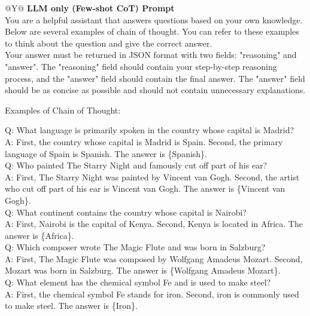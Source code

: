 \documentclass{article}
\theoremstyle{plain}
\theoremstyle{definition}
\theoremstyle{remark}
\begin{document}
\begin{table}[htb]
  \centering
  \caption{LLM only (Few-shot CoT) Prompt}
  \label{tab:llm_cot}
  \begin{tabularx}{\textwidth}{@{}Y@{}}
    \toprule
    \textbf{LLM only (Few-shot CoT) Prompt} \\     %
    \midrule
    You are a helpful assistant that answers questions based on your own knowledge. Below are several examples of chain of thought. You can refer to these examples to think about the question and give the correct answer. \\
    Your answer must be returned in JSON format with two fields: "reasoning" and "answer".
    The "reasoning" field should contain your step-by-step reasoning process, and the "answer" field should contain the final answer.
    The "answer" field should be as concise as possible and should not contain unnecessary explanations.\\

    \par\medskip
    Examples of Chain of Thought:

    Q: What language is primarily spoken in the country whose capital is Madrid?\\
    A: First, the country whose capital is Madrid is Spain. Second, the primary language of Spain is Spanish. The answer is \{Spanish\}.\\

    Q: Who painted The Starry Night and famously cut off part of his ear?\\
    A: First, The Starry Night was painted by Vincent van Gogh. Second, the artist who cut off part of his ear is Vincent van Gogh. The answer is \{Vincent van Gogh\}.\\

    Q: What continent contains the country whose capital is Nairobi?\\
    A: First, Nairobi is the capital of Kenya. Second, Kenya is located in Africa. The answer is \{Africa\}.\\

    Q: Which composer wrote The Magic Flute and was born in Salzburg?\\
    A: First, The Magic Flute was composed by Wolfgang Amadeus Mozart. Second, Mozart was born in Salzburg. The answer is \{Wolfgang Amadeus Mozart\}.\\

    Q: What element has the chemical symbol Fe and is used to make steel?\\
    A: First, the chemical symbol Fe stands for iron. Second, iron is commonly used to make steel. The answer is \{Iron\}.\\


\end{tabularx}
\end{table}
\end{document}
